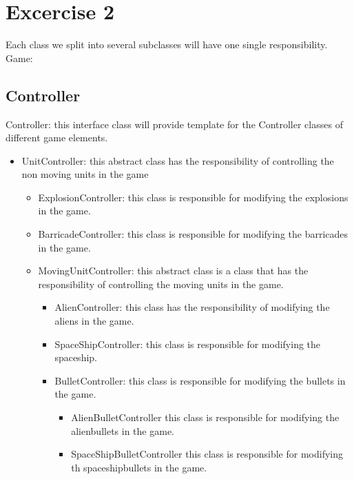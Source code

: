 \documentclass[10pt]{article}
\begin{document}
\section*{Excercise 2}
Each class we split into several subclasses will have one single responsibility. \\
Game:
\subsection*{Controller}
Controller: this interface class will provide template for the Controller classes of different game elements. 
	\begin{itemize}
	\item UnitController: this abstract class has the responsibility of controlling the non moving units in the game
		\begin{itemize}
			\item ExplosionController: this class is responsible for modifying the explosions in the game.
			\item BarricadeController: this class is responsible for modifying the 	barricades in the game.
			\item MovingUnitController: this abstract class is a class that has the responsibility of controlling the moving units in the game. 
			\begin{itemize}
				\item AlienController: this class has the responsibility of modifying the aliens in the game.
				\item SpaceShipController: this class is responsible for modifying the spaceship.
				\item BulletController: this class is responsible for modifying the bullets in the game.
				\begin{itemize}
					\item AlienBulletController this class is responsible for modifying the alienbullets in the game.
					\item SpaceShipBulletController this class is responsible for modifying th spaceshipbullets in the game.
				\end{itemize}
			\end{itemize}
		\end{itemize}
	\end{itemize}
\end{document}
